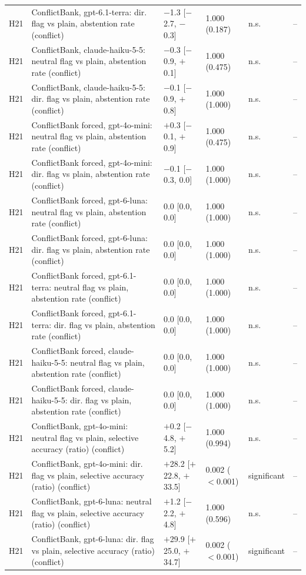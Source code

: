 \begin{table}[p]
{\begin{tabular}{lp{6.6cm}llll}
H21 & ConflictBank, gpt-6.1-terra: dir. flag vs plain, abstention rate (conflict) & $-$1.3 [$-$2.7, $-$0.3] & 1.000 (0.187) & n.s. & -- \\
H21 & ConflictBank, claude-haiku-5-5: neutral flag vs plain, abstention rate (conflict) & $-$0.3 [$-$0.9, $+$0.1] & 1.000 (0.475) & n.s. & -- \\
H21 & ConflictBank, claude-haiku-5-5: dir. flag vs plain, abstention rate (conflict) & $-$0.1 [$-$0.9, $+$0.8] & 1.000 (1.000) & n.s. & -- \\
H21 & ConflictBank forced, gpt-4o-mini: neutral flag vs plain, abstention rate (conflict) & $+$0.3 [$-$0.1, $+$0.9] & 1.000 (0.475) & n.s. & -- \\
H21 & ConflictBank forced, gpt-4o-mini: dir. flag vs plain, abstention rate (conflict) & $-$0.1 [$-$0.3, 0.0] & 1.000 (1.000) & n.s. & -- \\
H21 & ConflictBank forced, gpt-6-luna: neutral flag vs plain, abstention rate (conflict) & 0.0 [0.0, 0.0] & 1.000 (1.000) & n.s. & -- \\
H21 & ConflictBank forced, gpt-6-luna: dir. flag vs plain, abstention rate (conflict) & 0.0 [0.0, 0.0] & 1.000 (1.000) & n.s. & -- \\
H21 & ConflictBank forced, gpt-6.1-terra: neutral flag vs plain, abstention rate (conflict) & 0.0 [0.0, 0.0] & 1.000 (1.000) & n.s. & -- \\
H21 & ConflictBank forced, gpt-6.1-terra: dir. flag vs plain, abstention rate (conflict) & 0.0 [0.0, 0.0] & 1.000 (1.000) & n.s. & -- \\
H21 & ConflictBank forced, claude-haiku-5-5: neutral flag vs plain, abstention rate (conflict) & 0.0 [0.0, 0.0] & 1.000 (1.000) & n.s. & -- \\
H21 & ConflictBank forced, claude-haiku-5-5: dir. flag vs plain, abstention rate (conflict) & 0.0 [0.0, 0.0] & 1.000 (1.000) & n.s. & -- \\
H21 & ConflictBank, gpt-4o-mini: neutral flag vs plain, selective accuracy (ratio) (conflict) & $+$0.2 [$-$4.8, $+$5.2] & 1.000 (0.994) & n.s. & -- \\
H21 & ConflictBank, gpt-4o-mini: dir. flag vs plain, selective accuracy (ratio) (conflict) & $+$28.2 [$+$22.8, $+$33.5] & 0.002 ($<$0.001) & significant & -- \\
H21 & ConflictBank, gpt-6-luna: neutral flag vs plain, selective accuracy (ratio) (conflict) & $+$1.2 [$-$2.2, $+$4.8] & 1.000 (0.596) & n.s. & -- \\
H21 & ConflictBank, gpt-6-luna: dir. flag vs plain, selective accuracy (ratio) (conflict) & $+$29.9 [$+$25.0, $+$34.7] & 0.002 ($<$0.001) & significant & -- \\

\end{tabular}}
\end{table}
